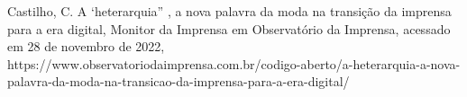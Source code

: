 \documentclass[
12pt,		%
openright,	%
twoside,  %
a4paper,			%
chapter=TITLE,		%
english,			%
french,				%
spanish,			%
brazil				%
]{USPSC-classe/USPSC}
\begin{document}
\begin{flushleft}
\begin{flushleft}
\begin{flushleft}
\begin{flushleft}
\begin{flushleft}
\begin{flushleft}
\begin{flushleft}
\begin{flushleft}
\begin{flushleft}
\begin{flushleft}
\begin{flushleft}
\begin{flushleft}
\begin{flushleft}
\begin{flushleft}
\begin{flushleft}
\begin{flushleft}
\begin{flushleft}
[CASTILHO, 2008] Castilho, C. A ‘heterarquia” , a nova palavra da moda na transi\c{c}\~ao da imprensa para a era digital, Monitor da Imprensa em Observat\'orio da Imprensa, acessado em 28 de novembro de 2022, https://www.observatoriodaimprensa.com.br/codigo-aberto/a-heterarquia-a-nova-palavra-da-moda-na-transicao-da-imprensa-para-a-era-digital/
\end{flushleft}


\end{flushleft}


\end{flushleft}


\end{flushleft}


\end{flushleft}


\end{flushleft}


\end{flushleft}


\end{flushleft}


\end{flushleft}


\end{flushleft}


\end{flushleft}


\end{flushleft}


\end{flushleft}


\end{flushleft}


\end{flushleft}


\end{flushleft}


\end{flushleft}
\end{document}
